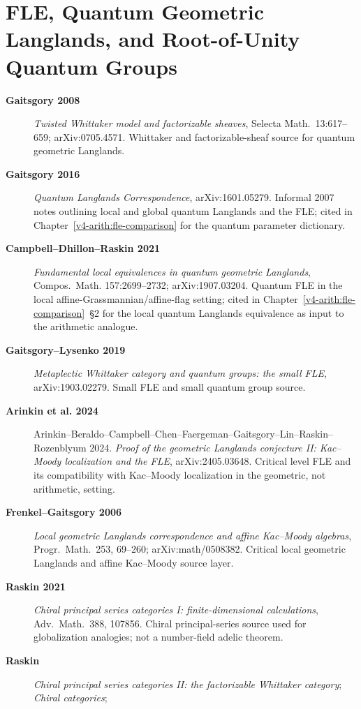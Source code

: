 \section{FLE, Quantum Geometric Langlands, and Root-of-Unity Quantum Groups}
\label{v4-arith:app:A:FLE-QGL}

\begin{description}
\item[\textbf{Gaitsgory 2008}] \emph{Twisted Whittaker model and
factorizable sheaves}, Selecta Math.~13:617--659; arXiv:0705.4571.
Whittaker and factorizable-sheaf source for quantum geometric
Langlands.
\item[\textbf{Gaitsgory 2016}] \emph{Quantum Langlands
Correspondence}, arXiv:1601.05279. Informal 2007 notes outlining
local and global quantum Langlands and the FLE; cited in
Chapter~\ref{v4-arith:fle-comparison} for the quantum parameter dictionary.
\item[\textbf{Campbell--Dhillon--Raskin 2021}] \emph{Fundamental
local equivalences in quantum geometric Langlands}, Compos.~Math.
157:2699--2732; arXiv:1907.03204. Quantum FLE in the local
affine-Grassmannian/affine-flag setting; cited in
Chapter~\ref{v4-arith:fle-comparison}~\S2 for the local quantum
Langlands equivalence as input to the arithmetic analogue.
\item[\textbf{Gaitsgory--Lysenko 2019}] \emph{Metaplectic Whittaker
category and quantum groups: the small FLE}, arXiv:1903.02279.
Small FLE and small quantum group source.
\item[\textbf{Arinkin et al. 2024}] Arinkin--Beraldo--Campbell--Chen--Faergeman--Gaitsgory--Lin--Raskin--Rozenblyum 2024. 
\emph{Proof of the geometric Langlands conjecture II:
Kac--Moody localization and the FLE}, arXiv:2405.03648. Critical
level FLE and its compatibility with Kac--Moody localization in the
geometric, not arithmetic, setting.
\item[\textbf{Frenkel--Gaitsgory 2006}] \emph{Local geometric
Langlands correspondence and affine Kac--Moody algebras},
Progr.~Math.~253, 69--260; arXiv:math/0508382. Critical local
geometric Langlands and affine Kac--Moody source layer.
\item[\textbf{Raskin 2021}] \emph{Chiral principal series
categories I: finite-dimensional calculations}, Adv.~Math.~388,
107856. Chiral principal-series source used for globalization
analogies; not a number-field adelic theorem.
\item[\textbf{Raskin}] \emph{Chiral principal series categories II:
the factorizable Whittaker category}; \emph{Chiral categories};

\end{description}

